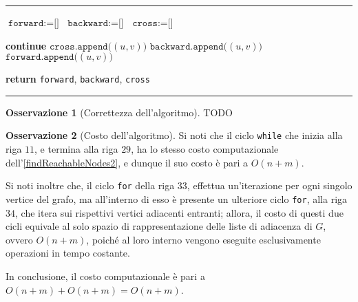 \documentclass[14pt]{extreport}
\newenvironment{nocaptionalg} %
{
    \par\addvspace{\topsep}
    \centering
    \begin{minipage}{\linewidth}
    \hrule\kern2pt
}
{
    \par\kern2pt\hrule
    \end{minipage}
    \par\addvspace{\topsep}
}
\theoremstyle{definition}
\theoremstyle{definition}
\newtheorem{remark}{Osservazione}[subsection]
\begin{document}
\begin{nocaptionalg}
    \begin{algorithmic}[1]
            \State $\texttt{forward} := \texttt{[]}$
            \State $\texttt{backward} := \texttt{[]}$
            \State $\texttt{cross} := \texttt{[]}$

                        \State \textbf{continue} 
                        \State $\texttt{cross.append(}(u, v)\texttt{)}$
                        \State $\texttt{backward.append(}(u, v)\texttt{)}$
                    \Else
                        \State $\texttt{forward.append(}(u, v)\texttt{)}$
                    \EndIf
                \EndFor
            \EndFor

            \State \textbf{return} \texttt{forward}, \texttt{backward}, \texttt{cross}
        \EndFunction
    \end{algorithmic}
\end{nocaptionalg}

\begin{remark}[Correttezza dell'algoritmo]
    TODO
\end{remark}

\begin{remark}[Costo dell'algoritmo]
    Si noti che il ciclo \texttt{while} che inizia alla riga $11$, e termina alla riga $29$, ha lo stesso costo computazionale dell'\cref{findReachableNodes2}, e dunque il suo costo è pari a $O(n + m)$.

    Si noti inoltre che, il ciclo \texttt{for} della riga $33$, effettua un'iterazione per ogni singolo vertice del grafo, ma all'interno di esso è presente un ulteriore ciclo \texttt{for}, alla riga $34$, che itera sui rispettivi vertici adiacenti entranti; allora, il costo di questi due cicli equivale al solo spazio di rappresentazione delle liste di adiacenza di $G$, ovvero $O(n + m)$, poiché al loro interno vengono eseguite esclusivamente operazioni in tempo costante.

    In conclusione, il costo computazionale è pari a $O(n + m) + O(n + m) = O(n + m)$.
\end{remark}
\end{document}

